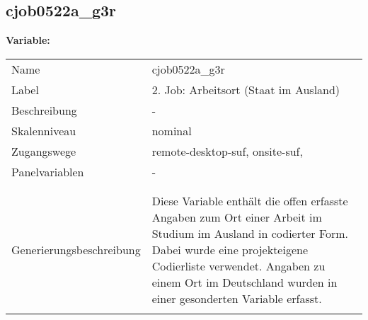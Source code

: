 	
	
	\subsection{cjob0522a\_g3r}
	\label{subSection:cjob0522a_g3r}

	\noindent\textbf{Variable:}\\
		\begin{tabular}{lL{11.3cm}}
			\label{tableVariable:cjob0522a_g3r}
			Name & cjob0522a\_g3r \\
			Label & 2. Job: Arbeitsort (Staat im Ausland) \\
			Beschreibung & - \\
			Skalenniveau & nominal \\
			Zugangswege &
				remote-desktop-suf,
				onsite-suf,
 \\
			Panelvariablen & -
			 \\
			 \\
 \\
					Generierungsbeschreibung & Diese Variable enthält die offen erfasste Angaben zum Ort einer Arbeit im Studium im Ausland in codierter Form. Dabei wurde eine projekteigene Codierliste verwendet. Angaben zu einem Ort im Deutschland wurden in einer gesonderten Variable erfasst. 
				 \\	
			 \\
		\end{tabular}






